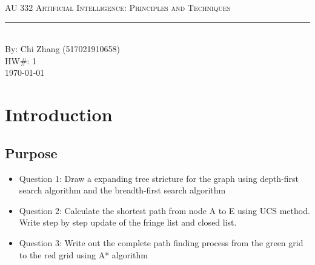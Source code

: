 \documentclass[aps,letterpaper,10pt]{revtex4}
\newcommand{\labtitle}{AU 332 Artificial Intelligence: Principles and Techniques}
\newcommand{\authorname}{Chi Zhang (517021910658)}
\newcommand{\hw}{1}
\begin{document}


\begin{titlepage}
\begin{center}
{\Large \textsc{\labtitle} \\ \vspace{4pt}}
\rule[13pt]{\textwidth}{1pt} \\ \vspace{150pt}
{\large By: \authorname \\ \vspace{10pt}
HW\#: \hw \\ \vspace{10pt}
\today}
\end{center}
\end{titlepage}





\section{Introduction}
\subsection{Purpose}

 
\begin{itemize}
	\item Question 1: Draw a expanding tree stricture for the graph using depth-first search algorithm and the breadth-first search algorithm
	\item Question 2: Calculate the shortest path from node A to E using UCS method. Write step by step update of the fringe list and closed list.
	\item Question 3: Write out the complete path finding process from the green grid to the red grid using A* algorithm
\end{itemize}
\end{document}
